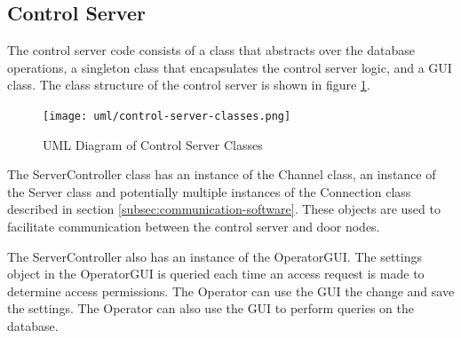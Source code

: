 \subsection{Control Server}

The control server code consists of a class that abstracts over the database
operations, a singleton class that encapsulates the control server logic, and a
GUI class. The class structure of the control server is shown in figure
\ref{fig:control-server-classes}.

\begin{figure}[!htb]
\centering
\texttt{[image: uml/control-server-classes.png]}
\caption{UML Diagram of Control Server Classes}
\label{fig:control-server-classes}
\end{figure}

The ServerController class has an instance of the Channel class, an instance
of the Server class and potentially multiple instances of the Connection class
described in section \ref{subsec:communication-software}. These objects are used
to facilitate communication between the control server and door nodes.

The ServerController also has an instance of the OperatorGUI.  The settings
object in the OperatorGUI is queried each time an access request is made to
determine access permissions.  The Operator can use the GUI the change and save
the settings.  The Operator can also use the GUI to perform queries on the
database.
